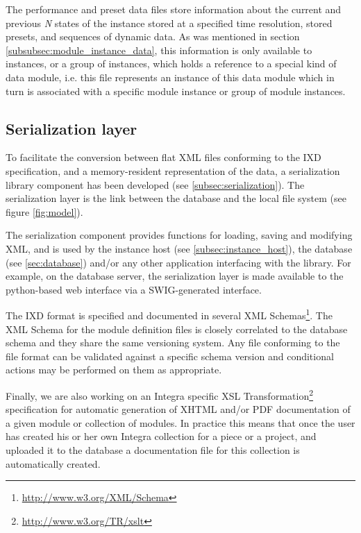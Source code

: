 The performance and preset data files store information about the
current and previous \emph{N} states of the instance stored at a
specified time resolution, stored presets, and sequences of dynamic
data. As was mentioned in section
\ref{subsubsec:module_instance_data}, this information is only
available to instances, or a group of instances, which holds a
reference to a special kind of data module, i.e. this file represents
an instance of this data module which in turn is associated with a
specific module instance or group of module instances.

\subsection{Serialization layer}\label{sec:serialization_layer}

To facilitate the conversion between flat XML files conforming to the
IXD specification, and a memory-resident representation of the data, a
serialization library component has been developed (see
\ref{subsec:serialization}). The serialization layer is the link
between the database and the local file system (see figure
\ref{fig:model}).

The serialization component provides functions for loading, saving and
modifying XML, and is used by the instance host (see
\ref{subsec:instance_host}), the database (see \ref{sec:database})
and/or any other application interfacing with the library. For
example, on the database server, the serialization layer is made
available to the python-based web interface via a SWIG-generated
interface.

The IXD format is specified and documented in several XML
Schemas\footnote{\url{http://www.w3.org/XML/Schema}}. The XML Schema
for the module definition files is closely correlated to the database
schema and they share the same versioning system. Any file conforming
to the file format can be validated against a specific schema version
and conditional actions may be performed on them as appropriate.

Finally, we are also working on an Integra specific XSL
Transformation\footnote{\url{http://www.w3.org/TR/xslt}} specification
for automatic generation of XHTML and/or PDF documentation of a given
module or collection of modules. In practice this means that once the
user has created his or her own Integra collection for a piece or a
project, and uploaded it to the database a documentation file for this
collection is automatically created.

